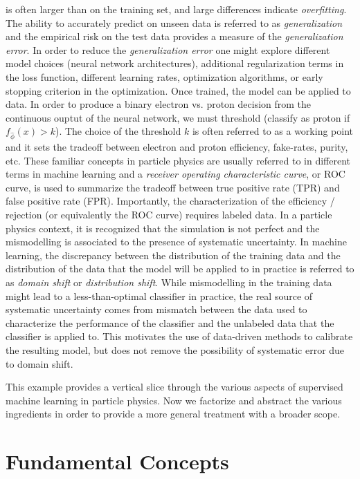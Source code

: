 is often larger than on the training set, and large differences indicate \textit{overfitting}. The ability to accurately predict on unseen data is referred to as \textit{generalization} and the empirical risk on the test data provides a measure of the \textit{generalization error}. In order to reduce the \textit{generalization error} one might explore different model choices (\eg neural network architectures), additional regularization terms in the loss function, different learning rates, optimization algorithms, or early stopping criterion in the optimization. Once trained, the model can be applied to data. In order to produce a binary electron vs. proton decision from the continuous ouptut of the neural network, we must threshold (\ie classify as proton if $f_{\hat\phi}(x)>k$). The choice of the threshold $k$ is often referred to as a working point and it sets the tradeoff between electron and proton efficiency, fake-rates, purity, etc. These familiar concepts in particle physics are usually referred to in different terms in machine learning and a \textit{receiver operating characteristic curve}, or ROC curve, is used to summarize the tradeoff between true positive rate (TPR) and false positive rate (FPR). Importantly, the characterization of the efficiency / rejection (or equivalently the ROC curve) requires labeled data. In a particle physics context, it is recognized that the simulation is not perfect and the mismodelling is associated to the presence of systematic uncertainty. In machine learning, the discrepancy between the distribution of the training data and the distribution of the data that the model will be applied to in practice is referred to as \textit{domain shift} or \textit{distribution shift}. While mismodelling in the training data might lead to a less-than-optimal classifier in practice, the real source of systematic uncertainty comes from mismatch between the data used to characterize the performance of the classifier and the unlabeled data that the classifier is applied to. This motivates the use of data-driven methods to calibrate the resulting model, but does not remove the possibility of systematic error due to domain shift.

This example provides a vertical slice through the various aspects of supervised machine learning in particle physics. Now we factorize and abstract the various ingredients in order to provide a more general treatment with a broader scope. 


\section{Fundamental Concepts}

